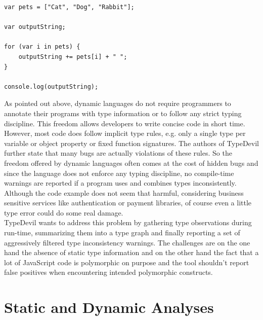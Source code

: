 \documentclass[runningheads,a4paper]{llncs}
\begin{document}
\medskip\medskip
\lstset{language=javascript}
\begin{minipage}{\linewidth}
\begin{lstlisting}[frame=single, caption=Implicit Coercions, label={listingPets}] 
var pets = ["Cat", "Dog", "Rabbit"];

var outputString;

for (var i in pets) {
    outputString += pets[i] + " ";
}

console.log(outputString);
\end{lstlisting}
\end{minipage}

As pointed out above, dynamic languages do not require programmers to annotate their programs with type information or to follow any strict typing discipline. 
This freedom allows developers to write concise code in short time. 
However, most code does follow implicit type rules, e.g. only a single type per variable or object property or fixed function signatures.
The authors of TypeDevil further state that many bugs are actually violations of these rules.
So the freedom offered by dynamic languages often comes at the cost of hidden bugs and since the language does not enforce any typing discipline, no compile-time warnings are reported if a program uses and combines types inconsistently.
Although the code example does not seem that harmful, considering business sensitive services like authentication or payment libraries, of course even a little type error could do some real damage. \\
TypeDevil wants to address this problem by gathering type observations during run-time, summarizing them into a type graph and finally reporting a set of aggressively filtered type inconsistency warnings.
The challenges are on the one hand the absence of static type information and on the other hand the fact that a lot of JavaScript code is polymorphic on purpose and the tool shouldn't report false positives when encountering intended polymorphic constructs.

\section{Static and Dynamic Analyses} \label{staticDynamicAnalysis}
\end{document}
